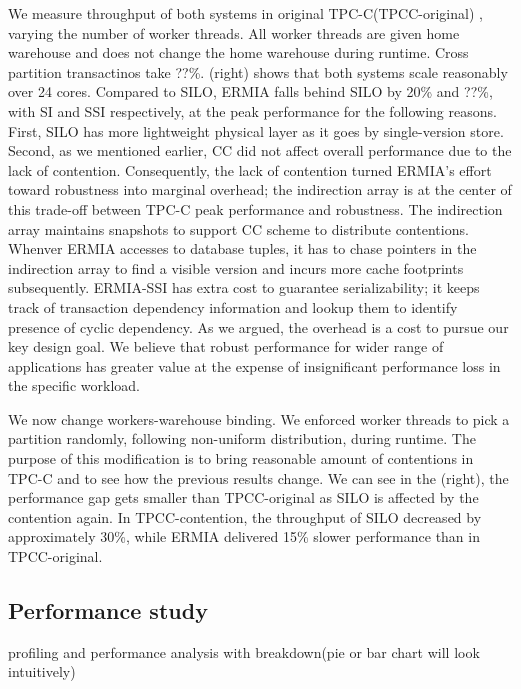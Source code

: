We measure throughput of both systems in original TPC-C(TPCC-original) , varying the number of worker threads. All worker threads are given home warehouse and does not change the home warehouse during runtime. Cross partition transactinos take ??\%. (right) shows that both systems scale reasonably over 24 cores. Compared to SILO, ERMIA falls behind SILO by 20\% and ??\%, with SI and SSI respectively, at the peak performance for the following reasons. First, SILO has more lightweight physical layer as it goes by single-version store. Second, as we mentioned earlier, CC did not affect overall performance due to the lack of contention. Consequently, the lack of contention turned ERMIA's effort toward robustness into marginal overhead; the indirection array is at the center of this trade-off between TPC-C peak performance and robustness. The indirection array maintains snapshots to support CC scheme to distribute contentions. Whenver ERMIA accesses to database tuples, it has to chase pointers in the indirection array to find a visible version and incurs more cache footprints subsequently. ERMIA-SSI has extra cost to guarantee serializability; it keeps track of transaction dependency information and lookup them to identify presence of cyclic dependency. As we argued, the overhead is a cost to pursue our key design goal. We believe that robust performance for wider range of applications has greater value at the expense of insignificant performance loss in the specific workload.

We now change workers-warehouse binding. We enforced worker threads to pick a partition randomly, following non-uniform distribution, during runtime. The purpose of this modification is to bring reasonable amount of contentions in TPC-C and to see how the previous results change. We can see in the (right), the performance gap gets smaller than TPCC-original as SILO is affected by the contention again. In TPCC-contention, the throughput of SILO decreased by approximately 30\%, while ERMIA delivered 15\% slower performance than in TPCC-original. 

\subsection{Performance study}

profiling and performance analysis with breakdown(pie or bar chart will look intuitively)

